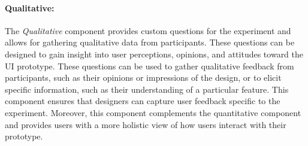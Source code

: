 \paragraph{Qualitative:}
The \textit{Qualitative} component provides custom questions for the experiment and allows for gathering qualitative data from participants. 
These questions can be designed to gain insight into user perceptions, opinions, and attitudes toward the UI prototype.
These questions can be used to gather qualitative feedback from participants, such as their opinions or impressions of the design, or to elicit specific information, such as their understanding of a particular feature. 
This component ensures that designers can capture user feedback specific to the experiment.
Moreover, this component complements the quantitative component and provides users with a more holistic view of how users interact with their prototype.


